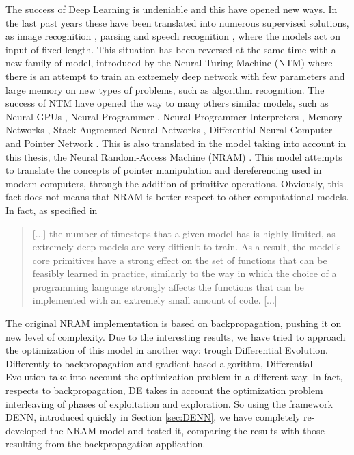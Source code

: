 The success of Deep Learning is undeniable and this have opened new ways. In the last past years these have been translated into numerous supervised solutions, as image recognition \cite{Krizhevsky2012ImageNetCW}, parsing \cite{Vinyals2015GrammarAA} and speech recognition \cite{Chan2015ListenAA}, where the models act on input of fixed length. This situation has been reversed at the same time with a new family of model, introduced by the Neural Turing Machine (NTM) \cite{Graves2014NeuralTM} where there is an attempt to train an extremely deep network with few parameters and large memory on new types of problems, such as algorithm recognition. The success of NTM have opened the way to many others similar models, such as Neural GPUs \cite{Kaiser2015NeuralGL}, Neural Programmer \cite{Neelakantan2015NeuralPI}, Neural Programmer-Interpreters \cite{Reed2015NeuralP}, Memory Networks \cite{Weston2014MemoryN}, Stack-Augmented Neural Networks \cite{Joulin2015InferringAP}, Differential Neural Computer \cite{Graves2016HybridCU} and Pointer Network \cite{Vinyals2015PointerN}.
\newline \newline
This is also translated in the model taking into account in this thesis, the Neural Random-Access Machine (NRAM) \cite{NRAM:2016}. This model attempts to translate the concepts of pointer manipulation and dereferencing used in modern computers, through the addition of primitive operations. Obviously, this fact does not means that NRAM is better respect to other computational models. In fact, as specified in \cite{NRAM:2016}
\begin{quote}
[...] the number of timesteps that a given model has is highly limited, as extremely deep models are very difficult to train. As a result, the model’s core primitives have a strong effect on the set of functions that can be feasibly learned in practice, similarly to the way in which the choice of a programming language strongly affects the functions that can be implemented with an extremely small amount of code. [...]
\end{quote}

The original NRAM implementation is based on backpropagation, pushing it on new level of complexity. Due to the interesting results, we have tried to approach the optimization of this model in another way: trough Differential Evolution. Differently to backpropagation and gradient-based algorithm, Differential Evolution take into account the optimization problem in a different way. In fact, respects to backpropagation, DE takes in account the optimization problem interleaving of phases of exploitation and exploration. So using the framework DENN, introduced quickly in Section \ref{sec:DENN}, we have completely re-developed the NRAM model and tested it, comparing the results with those resulting from the backpropagation application.